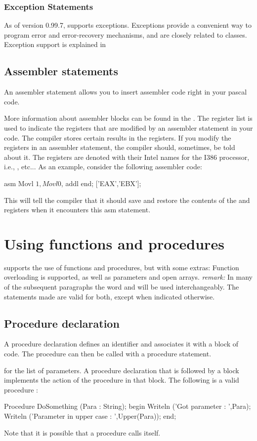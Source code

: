 \documentclass{report}
\begin{document}
\subsection{Exception Statements}
As of version 0.99.7, \fpc supports exceptions. Exceptions provide a
convenient way to program error and error-recovery mechanisms, and are
closely related to classes. 
Exception support is explained in 
\section{Assembler statements}
An assembler statement allows you to insert assembler code right in your
pascal code.

More information about assembler blocks can be found in the \progref.
The register list is used to indicate the registers that are modified by an
assembler statement in your code. The compiler stores certain results in the
registers. If you modify the registers in an assembler statement, the compiler
should, sometimes, be told about it. The registers are denoted with their
Intel names for the I386 processor, i.e., ,  etc...
As an example, consider the following assembler code:
\begin{listing}
asm
  Movl $1,%
  Movl $0,%
  addl %
end; ['EAX','EBX'];
\end{listing}
This will tell the compiler that it should save and restore the contents of 
the  and  registers when it encounters this asm statement.
\chapter{Using functions and procedures}
\label{ch:Procedures}
\fpc supports the use of functions and procedures, but with some extras:
Function overloading is supported, as well as  parameters and
open arrays.
{\em remark:} In many of the subsequent paragraphs the word  
and  will be used interchangeably. The statements made are
valid for both, except when indicated otherwise.
\section{Procedure declaration}
A procedure declaration defines an identifier and associates it with a
block of code. The procedure can then be called with a procedure statement.

 for the list of parameters.
A procedure declaration that is followed by a block implements the action of
the procedure in that block.
The following is a valid procedure : 
\begin{listing}
Procedure DoSomething (Para : String);
begin
  Writeln ('Got parameter : ',Para);
  Writeln ('Parameter in upper case : ',Upper(Para));
end;
\end{listing}
Note that it is possible that a procedure calls itself.
\end{document}
